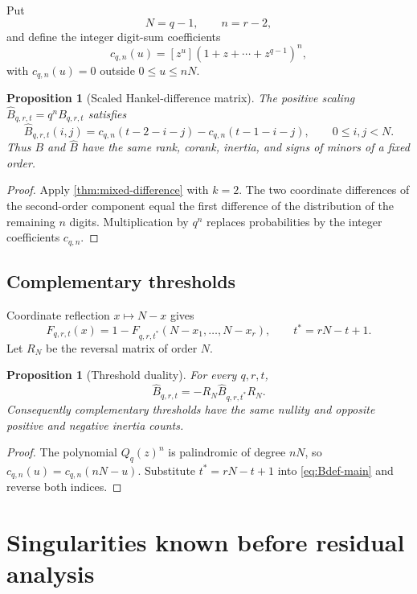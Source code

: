 \documentclass[11pt]{amsart}
\newcommand{\cB}{\widehat B}
\newcommand{\1}{\mathbf 1}
\newtheorem{proposition}[theorem]{Proposition}
\theoremstyle{remark}
\begin{document}
Put
\[
 N=q-1,\qquad n=r-2,
\]
and define the integer digit-sum coefficients
\[
 c_{q,n}(u)=[z^u](1+z+\cdots+z^{q-1})^n,
\]
with $c_{q,n}(u)=0$ outside $0\le u\le nN$.

\begin{proposition}[Scaled Hankel-difference matrix]\label{prop:B-formula}
The positive scaling $\cB_{q,r,t}=q^nB_{q,r,t}$ satisfies
\begin{equation}\label{eq:Bdef-main}
 \cB_{q,r,t}(i,j)=c_{q,n}(t-2-i-j)-c_{q,n}(t-1-i-j),
 \qquad 0\le i,j<N.
\end{equation}
Thus $B$ and $\cB$ have the same rank, corank, inertia, and signs of minors of a fixed order.
\end{proposition}

\begin{proof}
Apply \cref{thm:mixed-difference} with $k=2$. The two coordinate differences of the second-order component equal the first difference of the distribution of the remaining $n$ digits. Multiplication by $q^n$ replaces probabilities by the integer coefficients $c_{q,n}$.
\end{proof}

\subsection{Complementary thresholds}
Coordinate reflection $x\mapsto N-x$ gives
\[
 F_{q,r,t}(x)=1-F_{q,r,t^*}(N-x_1,\ldots,N-x_r),
 \qquad t^*=rN-t+1.
\]
Let $R_N$ be the reversal matrix of order $N$.

\begin{proposition}[Threshold duality]\label{prop:duality}
For every $q,r,t$,
\begin{equation}\label{eq:B-duality}
 \cB_{q,r,t}=-R_N\cB_{q,r,t^*}R_N.
\end{equation}
Consequently complementary thresholds have the same nullity and opposite positive and negative inertia counts.
\end{proposition}

\begin{proof}
The polynomial $Q_q(z)^n$ is palindromic of degree $nN$, so $c_{q,n}(u)=c_{q,n}(nN-u)$. Substitute $t^*=rN-t+1$ into \eqref{eq:Bdef-main} and reverse both indices.
\end{proof}

\section{Singularities known before residual analysis}
\label{sec:known-singularities}
\end{document}
